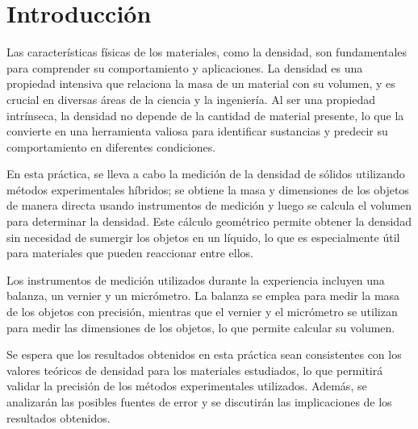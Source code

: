 \chapter{Introducción}
\thispagestyle{fancy}
\label{ch:introducción}

Las características físicas de los materiales, como la densidad, son
 fundamentales para comprender su comportamiento y aplicaciones. 
 La densidad es una propiedad intensiva que relaciona la masa de
  un material con su volumen, y es crucial en diversas áreas de la 
  ciencia y la ingeniería. Al ser una propiedad intrínseca, la densidad no depende de la cantidad de
    material presente, lo que la convierte en una herramienta valiosa para identificar sustancias 
    y predecir su comportamiento en diferentes condiciones.
  
  En esta práctica, se lleva a cabo la 
  medición de la densidad de sólidos utilizando métodos experimentales híbridos;
  se obtiene la masa y dimensiones de los objetos de manera directa usando 
  instrumentos de medición y luego se calcula el volumen para determinar 
  la densidad. Este cálculo geométrico permite obtener la densidad sin necesidad de 
  sumergir los objetos en un líquido, 
  lo que es especialmente útil para materiales que pueden reaccionar entre ellos.

  Los instrumentos de medición utilizados durante la experiencia incluyen una balanza,
  un vernier y un micrómetro. La balanza se emplea para medir la masa de los
objetos con precisión, mientras que el vernier y el micrómetro se utilizan
 para medir las dimensiones de los objetos, 
lo que permite calcular su volumen.

Se espera que los resultados obtenidos en esta 
práctica sean consistentes con los valores teóricos 
de densidad para los materiales estudiados, lo que permitirá 
validar la precisión de los métodos experimentales utilizados. 
Además, se analizarán las posibles fuentes de error y se discutirán 
las implicaciones de los resultados obtenidos.
